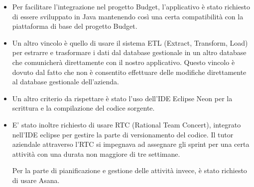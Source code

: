 \begin{itemize}

\item Per facilitare l'integrazione nel progetto Budget, l'applicativo è stato richiesto di essere sviluppato in Java mantenendo così una certa compatibilità con la piattaforma di base del progetto Budget. 

\item Un altro vincolo è quello di usare il sistema ETL (Extract, Transform, Load) per estrarre e trasformare i dati dal database gestionale in un altro database che comunicherà direttamente con il nostro applicativo. Questo vincolo è dovuto dal fatto che non è consentito effettuare delle modifiche direttamente al database gestionale dell'azienda.

\item Un altro criterio da rispettare è stato l'uso  dell'\gls{IDE} Eclipse Neon per la scrittura e la compilazione del codice sorgente.

 \item E' stato inoltre richiesto di usare RTC (Rational Team Concert), integrato nell'IDE eclipse per gestire la parte di versionamento del codice. Il tutor aziendale attraverso l'RTC si impegnava ad assegnare gli sprint per una certa attività con una durata non maggiore di tre settimane. 
 
 Per la parte di pianificazione e gestione delle attività invece, è stato richiesto di usare Asana.  
 
 \end{itemize}

\clearpage

